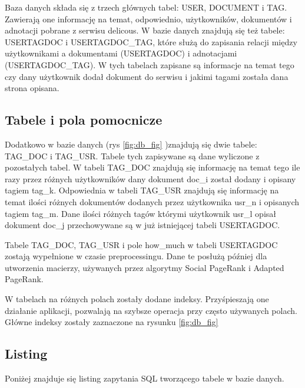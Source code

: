 \documentclass[11pt,a4paper]{report}
\begin{document}
Baza danych składa się z trzech głównych tabel: USER, DOCUMENT i TAG. Zawierają one informację na temat, odpowiednio, użytkowników, dokumentów i adnotacji pobrane z serwisu delicous. W bazie danych znajdują się też tabele: USERTAGDOC i USERTAGDOC\_TAG, które służą do zapisania relacji między użytkownikami a dokumentami (USERTAGDOC) i adnotacjami (USERTAGDOC\_TAG). W tych tabelach zapisane są  informacje na temat tego czy dany użytkownik dodał dokument do serwisu i jakimi tagami została dana strona opisana.

\subsection{Tabele i pola pomocnicze}
Dodatkowo w bazie danych (rys \ref{fig:db_fig} )znajdują się dwie tabele: TAG\_DOC i TAG\_USR. Tabele tych zapisywane są dane wyliczone z pozostałych tabel. W tabeli TAG\_DOC znajdują się informację na temat tego ile razy przez różnych użytkowników dany dokument doc\_i  został dodany i opisany tagiem tag\_k. Odpowiednia w tabeli TAG\_USR znajdują się informację na temat ilości różnych dokumentów dodanych przez użytkownika usr\_n i opisanych tagiem tag\_m. Dane ilości różnych tagów którymi użytkownik usr\_l opisał dokument doc\_j przechowywane są w już istniejącej tabeli USERTAGDOC. 

Tabele TAG\_DOC, TAG\_USR i pole how\_much w tabeli USERTAGDOC zostają wypełnione w czasie preprocessingu. Dane te posłużą  później dla utworzenia macierzy, używanych przez algorytmy Social PageRank i Adapted PageRank. 


W tabelach na różnych polach zostały dodane indeksy. Przyśpieszają one działanie aplikacji, pozwalają na szybsze operacja przy często używanych polach. Główne indeksy zostały zaznaczone na rysunku \ref{fig:db_fig}

\subsection{Listing}
Poniżej znajduje się listing zapytania SQL tworzącego tabele w bazie danych.
\end{document}
